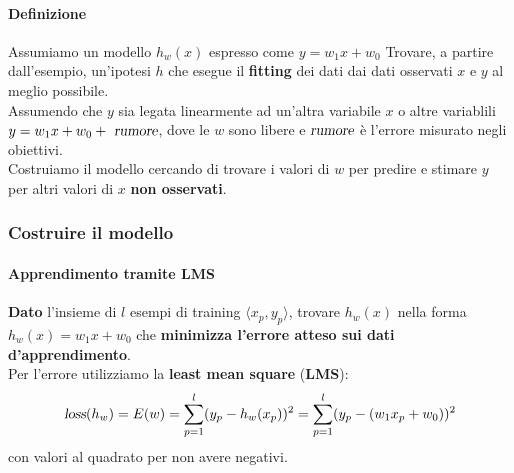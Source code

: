\documentclass[10pt]{book}
\begin{document}
\paragraph{Definizione} Assumiamo un modello $h_w(x)$ espresso come $y = w_1x + w_0$
Trovare, a partire dall'esempio, un'ipotesi $h$ che esegue il \textbf{fitting} dei dati dai dati osservati $x$ e $y$ al meglio possibile.\\
Assumendo che $y$ sia legata linearmente ad un'altra variabile $x$ o altre variablili $y= w_1x + w_0 + \textsl{ rumore}$, dove le $w$ sono libere e $\textsl{rumore}$ è l'errore misurato negli obiettivi.\\
Costruiamo il modello cercando di trovare i valori di $w$ per predire e stimare $y$ per altri valori di $x$ \textbf{non osservati}.
\subsubsection{Costruire il modello}
\paragraph{Apprendimento tramite LMS} \textbf{Dato} l'insieme di $l$ esempi di training $\langle x_p, y_p\rangle$, trovare $h_w(x)$ nella forma\\$h_w(x) = w_1 x + w_0$ che \textbf{minimizza l'errore atteso sui dati d'apprendimento}.\\
Per l'errore utilizziamo la \textbf{least mean square} (\textbf{LMS}): $$\textsl{loss}(h_w) = E(w) = \sum_{p=1}^l (y_p - h_w(x_p))^2 = \sum_{p=1}^l (y_p - (w_1x_p + w_0))^2$$ con valori al quadrato per non avere negativi.
\end{document}
